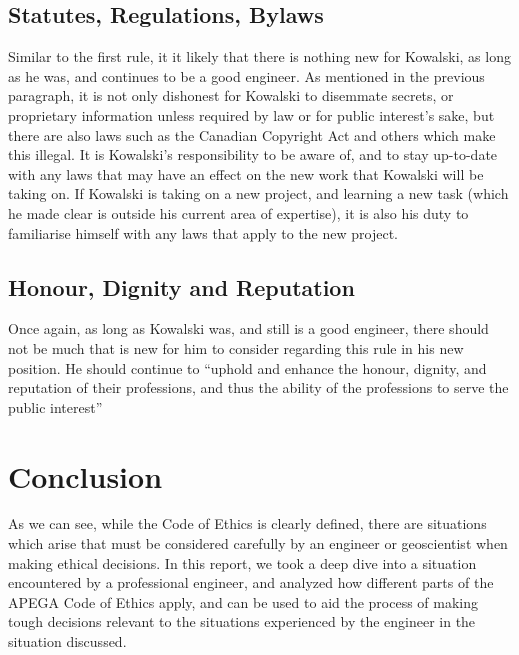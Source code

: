 \documentclass[letterpaper,12pt]{article}
\begin{document}
\subsection{Statutes, Regulations, Bylaws}
Similar to the first rule, it it likely that there is nothing new for Kowalski, as long as he was, and continues to be a good engineer.
As mentioned in the previous paragraph, it is not only dishonest for Kowalski to disemmate secrets, or proprietary information unless required
by law or for public interest's sake, but there are also laws such as the Canadian Copyright Act and others which make this illegal. It is
Kowalski's responsibility to be aware of, and to stay up-to-date with any laws that may have an effect on the new work that Kowalski will be taking on.
If Kowalski is taking on a new project, and learning a new task (which he made clear is outside his current area of expertise), it is also his duty to
familiarise himself with any laws that apply to the new project.

\subsection{Honour, Dignity and Reputation}
Once again, as long as Kowalski was, and still is a good engineer, there should not be much that is new for him to consider regarding this rule
in his new position. He should continue to ``uphold and enhance the honour, dignity,
and reputation of their professions, and thus the ability of the professions to serve the
public interest''\cite{apegacode}

\section{Conclusion}
As we can see, while the Code of Ethics is clearly defined, there are situations which arise that must be considered carefully by an engineer or
geoscientist when making ethical decisions. In this report, we took a deep dive into a situation encountered by a professional engineer,
and analyzed how different parts of the APEGA Code of Ethics apply, and can be used to aid the process of making 
tough decisions relevant to the situations experienced by the engineer in the
situation discussed.


\singlespacing
\nocite{*}
\printbibliography
\end{document}
